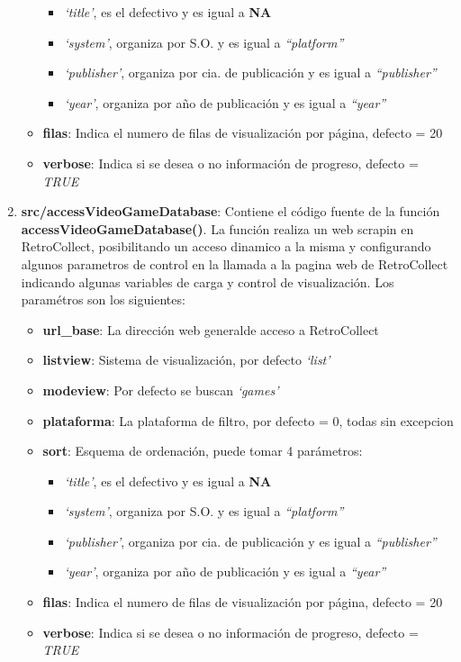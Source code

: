 \documentclass[]{article}
\providecommand{\tightlist}{%
  \setlength{\itemsep}{0pt}\setlength{\parskip}{0pt}}
\begin{document}
\begin{enumerate}
\begin{itemize}
    \begin{itemize}
    \tightlist
    \item
      \emph{`title'}, es el defectivo y es igual a \textbf{NA}
    \item
      \emph{`system'}, organiza por S.O. y es igual a
      \emph{``platform''}
    \item
      \emph{`publisher'}, organiza por cia. de publicación y es igual a
      \emph{``publisher''}
    \item
      \emph{`year'}, organiza por año de publicación y es igual a
      \emph{``year''}
    \end{itemize}
  \item
    \textbf{filas}: Indica el numero de filas de visualización por
    página, defecto = 20
  \item
    \textbf{verbose}: Indica si se desea o no información de progreso,
    defecto = \emph{TRUE}
  \end{itemize}
\item
  \textbf{src/accessVideoGameDatabase}: Contiene el código fuente de la
  función \textbf{accessVideoGameDatabase()}. La función realiza un web
  scrapin en RetroCollect, posibilitando un acceso dinamico a la misma y
  configurando algunos parametros de control en la llamada a la pagina
  web de RetroCollect indicando algunas variables de carga y control de
  visualización. Los paramétros son los siguientes:

  \begin{itemize}
  \tightlist
  \item
    \textbf{url\_base}: La dirección web generalde acceso a RetroCollect
  \item
    \textbf{listview}: Sistema de visualización, por defecto
    \emph{`list'}
  \item
    \textbf{modeview}: Por defecto se buscan \emph{`games'}
  \item
    \textbf{plataforma}: La plataforma de filtro, por defecto = 0, todas
    sin excepcion
  \item
    \textbf{sort}: Esquema de ordenación, puede tomar 4 parámetros:

    \begin{itemize}
    \tightlist
    \item
      \emph{`title'}, es el defectivo y es igual a \textbf{NA}
    \item
      \emph{`system'}, organiza por S.O. y es igual a
      \emph{``platform''}
    \item
      \emph{`publisher'}, organiza por cia. de publicación y es igual a
      \emph{``publisher''}
    \item
      \emph{`year'}, organiza por año de publicación y es igual a
      \emph{``year''}
    \end{itemize}
  \item
    \textbf{filas}: Indica el numero de filas de visualización por
    página, defecto = 20
  \item
    \textbf{verbose}: Indica si se desea o no información de progreso,
    defecto = \emph{TRUE}
  \end{itemize}
\end{enumerate}
\end{document}
